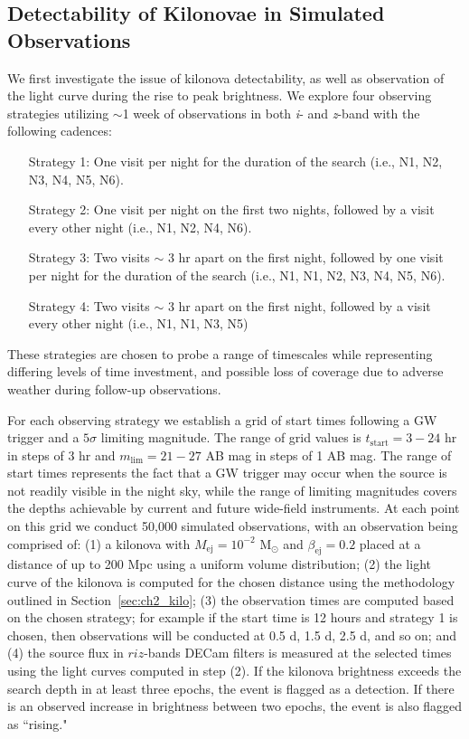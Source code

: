 \subsection{Detectability of Kilonovae in Simulated Observations}
\label{sec:ch2_MCsims_det}
We first investigate the issue of kilonova detectability, as well as observation of the light curve during the rise to peak brightness. We explore four observing strategies utilizing $\sim$1 week of observations in both {\em i}- and {\em z}-band with the following cadences:
{\small \begin{enumerate}[leftmargin = 2.5cm]
\item[Strategy 1:] One visit per night for the duration of the search (i.e., N1, N2, N3, N4, N5, N6).
\item[Strategy 2:]  One visit per night on the first two nights, followed by a visit every other night (i.e., N1, N2, N4, N6).
\item[Strategy 3:]  Two visits $\sim$ 3 hr apart on the first night, followed by one visit per night for the duration of the search (i.e., N1, N1, N2, N3, N4, N5, N6).
\item[Strategy 4:]  Two visits $\sim$ 3 hr apart on the first night, followed by a visit every other night (i.e., N1, N1, N3, N5)
\end{enumerate}}
\noindent These strategies are chosen to probe a range of timescales while representing differing levels of time investment, and possible loss of coverage due to adverse weather during follow-up observations.

For each observing strategy we establish a grid of start times following a GW trigger and a $5\sigma$ limiting magnitude. The range of grid values is $t_{\text{start}} = 3-24$ hr in steps of 3 hr and $m_{\text{lim}} = 21-27$ AB mag in steps of 1 AB mag. The range of start times represents the fact that a GW trigger may occur when the source is not readily visible in the night sky, while the range of limiting magnitudes covers the depths achievable by current and future wide-field instruments. At each point on this grid we conduct 50,000 simulated observations, with an observation being comprised of: (1) a kilonova with $M_{\text{ej}} = 10^{-2} \text{ M}_{\odot}$ and $\beta_{\text{ej}} = 0.2$ placed at a distance of up to 200 Mpc using a uniform volume distribution; (2) the light curve of the kilonova is computed for the chosen distance using the methodology outlined in Section~\ref{sec:ch2_kilo}; (3) the observation times are computed based on the chosen strategy; for example if the start time is 12 hours and strategy 1 is chosen, then observations will be conducted at 0.5 d, 1.5 d, 2.5 d, and so on; and (4) the source flux in $riz$-bands DECam filters is measured at the selected times using the light curves computed in step (2). If the kilonova brightness exceeds the search depth in at least three epochs, the event is flagged as a detection. If there is an observed increase in brightness between two epochs, the event is also flagged as ``rising."

